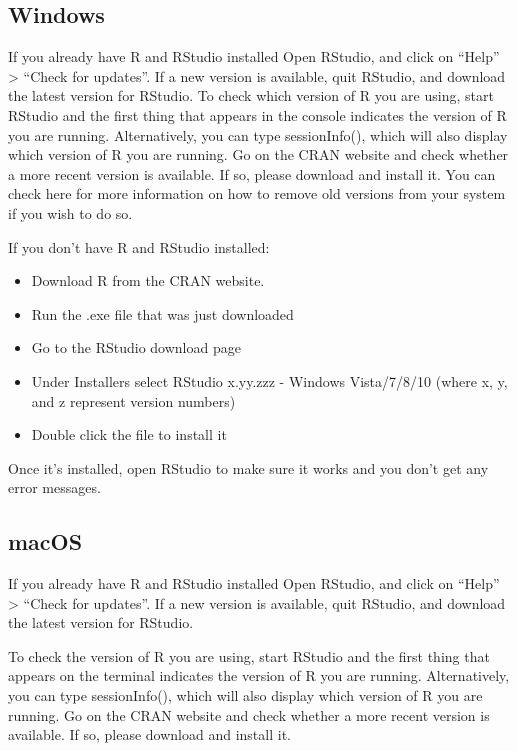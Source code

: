 \documentclass[]{book}
\providecommand{\tightlist}{%
  \setlength{\itemsep}{0pt}\setlength{\parskip}{0pt}}
\begin{document}
\hypertarget{windows}{%
\subsection{Windows}\label{windows}}

If you already have R and RStudio installed
Open RStudio, and click on ``Help'' \textgreater{} ``Check for updates''. If a new version is available, quit RStudio, and download the latest version for RStudio.
To check which version of R you are using, start RStudio and the first thing that appears in the console indicates the version of R you are running. Alternatively, you can type sessionInfo(), which will also display which version of R you are running. Go on the CRAN website and check whether a more recent version is available. If so, please download and install it. You can check here for more information on how to remove old versions from your system if you wish to do so.

If you don't have R and RStudio installed:

\begin{itemize}
\tightlist
\item
  Download R from the CRAN website.
\item
  Run the .exe file that was just downloaded
\item
  Go to the RStudio download page
\item
  Under Installers select RStudio x.yy.zzz - Windows Vista/7/8/10 (where x, y, and z represent version numbers)
\item
  Double click the file to install it
\end{itemize}

Once it's installed, open RStudio to make sure it works and you don't get any error messages.

\hypertarget{macos}{%
\subsection{macOS}\label{macos}}

If you already have R and RStudio installed
Open RStudio, and click on ``Help'' \textgreater{} ``Check for updates''. If a new version is available, quit RStudio, and download the latest version for RStudio.

To check the version of R you are using, start RStudio and the first thing that appears on the terminal indicates the version of R you are running. Alternatively, you can type sessionInfo(), which will also display which version of R you are running. Go on the CRAN website and check whether a more recent version is available. If so, please download and install it.
\end{document}
